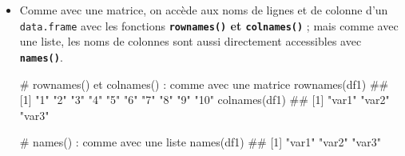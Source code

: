 \documentclass[12pt,twosided, notitlepage]{book}
\newenvironment{Shaded}{}{}
\newcommand{\CommentTok}[1]{\textcolor[rgb]{0.00,0.50,0.00}{#1}}
\newcommand{\KeywordTok}[1]{\textcolor[rgb]{0.00,0.00,1.00}{#1}}
\newcommand{\NormalTok}[1]{#1}
\renewenvironment{Shaded}{\begin{snugshade}}{\end{snugshade}}
\begin{document}
\begin{itemize}
\item
  Comme avec une matrice, on accède aux noms de lignes et de colonne
  d'un \texttt{data.frame} avec les fonctions
  \textbf{\texttt{rownames()} et
  \texttt{colnames()}}
  ; mais comme avec une liste, les noms de colonnes sont aussi
  directement accessibles avec
  \textbf{\texttt{names()}}.

\begin{Shaded}
\begin{Highlighting}[]
\CommentTok{# rownames() et colnames() : comme avec une matrice}
\KeywordTok{rownames}\NormalTok{(df1)}
\NormalTok{  ##  [1] "1"  "2"  "3"  "4"  "5"  "6"  "7"  "8"  "9"  "10"}
\KeywordTok{colnames}\NormalTok{(df1)}
\NormalTok{  ## [1] "var1" "var2" "var3"}

\CommentTok{# names() : comme avec une liste}
\KeywordTok{names}\NormalTok{(df1)}
\NormalTok{  ## [1] "var1" "var2" "var3"}
\end{Highlighting}
\end{Shaded}
\end{itemize}

~
\end{document}
